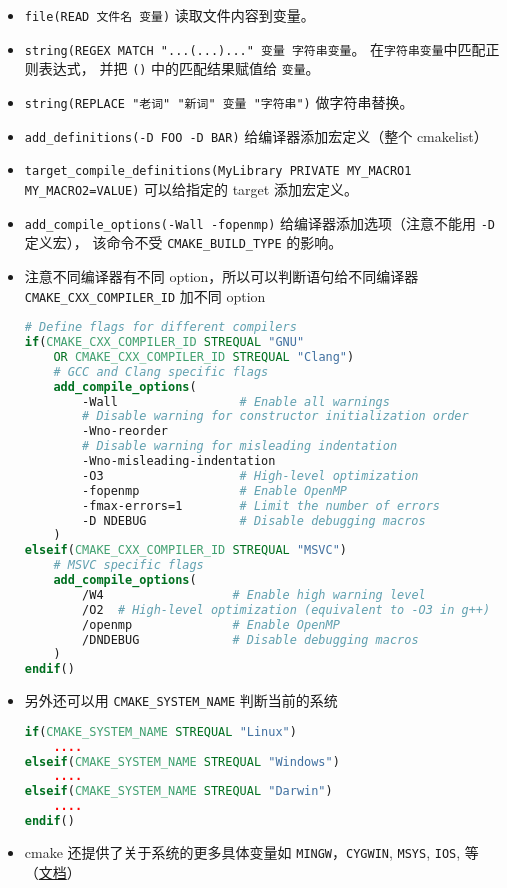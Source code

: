 \begin{itemize}
\item \verb`file(READ 文件名 变量)` 读取文件内容到变量。
\item \verb`string(REGEX MATCH "...(...)..." 变量 字符串变量`。 在\verb`字符串变量`中匹配正则表达式， 并把 \verb`()` 中的匹配结果赋值给 \verb`变量`。
\item \verb`string(REPLACE "老词" "新词" 变量 "字符串")` 做字符串替换。
\item \verb`add_definitions(-D FOO -D BAR)` 给编译器添加宏定义（整个 cmakelist）
\item \verb`target_compile_definitions(MyLibrary PRIVATE MY_MACRO1 MY_MACRO2=VALUE)` 可以给指定的 target 添加宏定义。
\item \verb`add_compile_options(-Wall -fopenmp)` 给编译器添加选项（注意不能用 \verb`-D` 定义宏）， 该命令不受 \verb`CMAKE_BUILD_TYPE` 的影响。
\item 注意不同编译器有不同 option，所以可以判断语句给不同编译器 \verb`CMAKE_CXX_COMPILER_ID` 加不同 option
\begin{lstlisting}[language=cmake]
# Define flags for different compilers
if(CMAKE_CXX_COMPILER_ID STREQUAL "GNU"
    OR CMAKE_CXX_COMPILER_ID STREQUAL "Clang")
    # GCC and Clang specific flags
    add_compile_options(
        -Wall                 # Enable all warnings
        # Disable warning for constructor initialization order
        -Wno-reorder
        # Disable warning for misleading indentation
        -Wno-misleading-indentation
        -O3                   # High-level optimization
        -fopenmp              # Enable OpenMP
        -fmax-errors=1        # Limit the number of errors
        -D NDEBUG             # Disable debugging macros
    )
elseif(CMAKE_CXX_COMPILER_ID STREQUAL "MSVC")
    # MSVC specific flags
    add_compile_options(
        /W4                  # Enable high warning level
        /O2  # High-level optimization (equivalent to -O3 in g++)
        /openmp              # Enable OpenMP
        /DNDEBUG             # Disable debugging macros
    )
endif()
\end{lstlisting}
\item 另外还可以用 \verb`CMAKE_SYSTEM_NAME` 判断当前的系统
\begin{lstlisting}[language=cmake]
if(CMAKE_SYSTEM_NAME STREQUAL "Linux")
    ....
elseif(CMAKE_SYSTEM_NAME STREQUAL "Windows")
    ....
elseif(CMAKE_SYSTEM_NAME STREQUAL "Darwin")
    ....
endif()
\end{lstlisting}
\item cmake 还提供了关于系统的更多具体变量如 \verb`MINGW`，\verb`CYGWIN`, \verb`MSYS`, \verb`IOS`, 等（\href{https://cmake.org/cmake/help/latest/manual/cmake-variables.7.html}{文档}）

\end{itemize}
